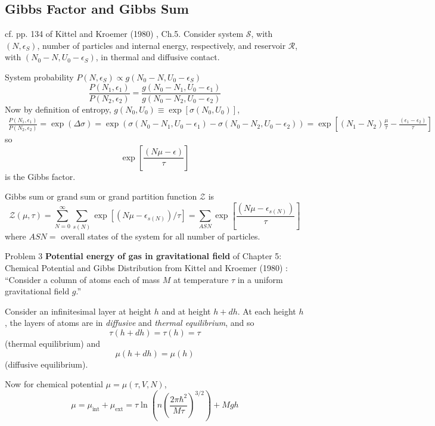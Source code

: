 \subsection{Gibbs Factor and Gibbs Sum} cf. pp. 134 of Kittel and Kroemer (1980) \cite{CKittelHKroemer1980}, Ch.5.  
Consider system $\mathcal{S}$, with $(N,\epsilon_S)$, number of particles and internal energy, respectively, and reservoir $\mathcal{R}$, with $(N_0-N,U_0-\epsilon_S)$, in thermal and diffusive contact.  

System probability $P(N,\epsilon_S) \propto g(N_0- N,U_0-\epsilon_S)$
\[
\frac{ P(N_1,\epsilon_1) }{ P(N_2,\epsilon_2) } = \frac{ g(N_0-N_1, U_0-\epsilon_1)}{ g(N_0-N_2, U_0-\epsilon_2) }
\]
Now by definition of entropy, $g(N_0,U_0) \equiv \exp{ [\sigma(N_0,U_0)]}$,
\[
\begin{gathered}
  \frac{ P(N_1,\epsilon_1) }{ P(N_2,\epsilon_2) } = \exp{ (\Delta \sigma )} = \exp{ ( \sigma(N_0 -N_1, U_0 -\epsilon_1) - \sigma(N_0 -N_2, U_0 -\epsilon_2) ) }  = \exp{ \left[ (N_1-N_2) \frac{\mu}{\tau} - \frac{ (\epsilon_1-\epsilon_2)}{\tau} \right] }
\end{gathered}
\]
so 
\[
\exp{ \left[ \frac{(N\mu - \epsilon )}{\tau } \right] }
\]
is the Gibbs factor.  

Gibbs sum or grand sum or grand partition function $\mathcal{Z}$ is   
\[
\mathcal{Z}(\mu,\tau) = \sum_{N=0}^{\infty} \sum_{s(N)} \exp{ \left[ (N \mu - \epsilon_{s(N)} )/\tau \right] } = \sum_{ASN} \exp{ \left[ \frac{(N\mu - \epsilon_{s(N)} ) }{\tau} \right] }
\]
where $ASN = $ overall states of the system for all number of particles.  






Problem 3 \textbf{Potential energy of gas in gravitational field} of Chapter 5: Chemical Potential and Gibbs Distribution from Kittel and Kroemer (1980) \cite{CKittelHKroemer1980}: ``Consider a column of atoms each of mass $M$ at temperature $\tau$ in a uniform gravitational field $g$.''

Consider an infinitesimal layer at height $h$ and at height $h+dh$.  At each height $h$, the layers of atoms are in \emph{diffusive} and \emph{thermal equilibrium}, and so
\[
\tau(h+dh) = \tau(h) = \tau
\]
(thermal equilibrium) and 
\[
\mu(h+dh) = \mu(h)
\]
(diffusive equilibrium).  

Now for chemical potential $\mu = \mu(\tau,V,N)$,
\[
\mu = \mu_{\text{int}} + \mu_{\text{ext}} = \tau \ln{ \left( n \left( \frac{ 2\pi \hbar^2 }{M\tau} \right)^{3/2} \right) } + Mgh
\]

